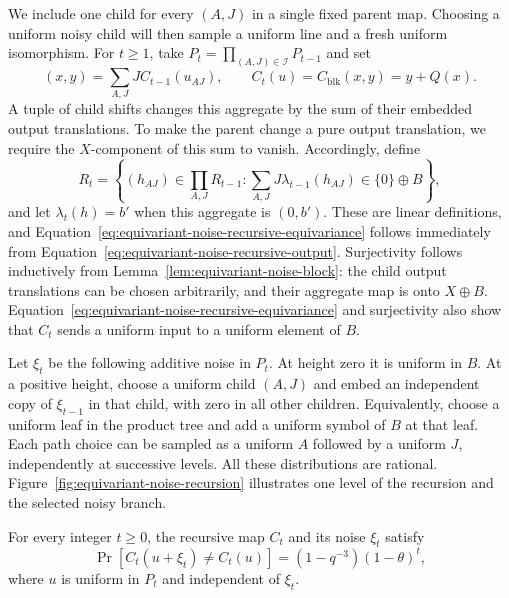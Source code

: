 We include one child for every $(A,J)$ in a single fixed parent map.
Choosing a uniform noisy child will then sample a uniform line and a fresh
uniform isomorphism.
For $t\ge1$, take $P_t=\prod_{(A,J)\in\mathcal I}P_{t-1}$ and set
\begin{equation}\label{eq:equivariant-noise-recursive-output}
 (x,y)=\sum_{A,J}J C_{t-1}(u_{AJ}),
 \qquad C_t(u)=C_{\mathrm{blk}}(x,y)=y+Q(x).
\end{equation}
A tuple of child shifts changes this aggregate by the sum of their embedded
output translations.  To make the parent change a pure output translation,
we require the $X$-component of this sum to vanish.  Accordingly, define
\begin{equation}\label{eq:equivariant-noise-recursive-shifts}
 R_t=\left\{(h_{AJ})\in\prod_{A,J}R_{t-1}:
       \sum_{A,J}J\lambda_{t-1}(h_{AJ})\in\{0\}\oplus B\right\},
\end{equation}
and let $\lambda_t(h)=b'$ when this aggregate is $(0,b')$.
These are linear definitions, and Equation~\eqref{eq:equivariant-noise-recursive-equivariance}
follows immediately from Equation~\eqref{eq:equivariant-noise-recursive-output}.
Surjectivity follows inductively from Lemma~\ref{lem:equivariant-noise-block}: the
child output translations can be chosen arbitrarily, and their aggregate map
is onto $X\oplus B$.
Equation~\eqref{eq:equivariant-noise-recursive-equivariance} and surjectivity also show
that $C_t$ sends a uniform input to a uniform element of $B$.

Let $\xi_t$ be the following additive noise in $P_t$.
At height zero it is uniform in $B$.  At a positive height, choose a
uniform child $(A,J)$ and embed an independent copy of $\xi_{t-1}$ in
that child, with zero in all other children.  Equivalently, choose a
uniform leaf in the product tree and add a uniform symbol of $B$ at that
leaf.  Each path choice can be sampled as a uniform $A$ followed by a
uniform $J$, independently at successive levels.  All these distributions
are rational. Figure~\ref{fig:equivariant-noise-recursion} illustrates one level
of the recursion and the selected noisy branch.

\FloatBarrier

\begin{lemma}\label{lem:equivariant-noise-noise}
For every integer $t\ge0$, the recursive map $C_t$ and its noise
$\xi_t$ satisfy
\begin{equation}\label{eq:equivariant-noise-change-probability}
 \Pr[C_t(u+\xi_t)\ne C_t(u)]
     =(1-q^{-3})(1-\theta)^t,
\end{equation}
where $u$ is uniform in $P_t$ and independent of $\xi_t$.
\end{lemma}

